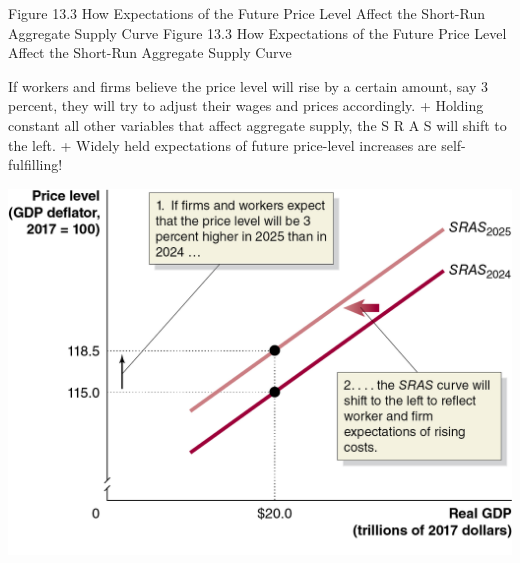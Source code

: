 \documentclass[
  12pt,
  ignorenonframetext,
]{beamer}
\begin{document}
\begin{frame}{Figure 13.3 How Expectations of the Future Price Level
Affect the Short-Run Aggregate Supply Curve}
\protect\hypertarget{figure-13.3-how-expectations-of-the-future-price-level-affect-the-short-run-aggregate-supply-curve}{}
Figure 13.3 How Expectations of the Future Price Level Affect the
Short-Run Aggregate Supply Curve

If workers and firms believe the price level will rise by a certain
amount, say 3 percent, they will try to adjust their wages and prices
accordingly. + Holding constant all other variables that affect
aggregate supply, the S R A S will shift to the left. + Widely held
expectations of future price-level increases are self-fulfilling!

\includegraphics[width=\textwidth,height=0.99\textheight]{imgs3/img_slide26a.png}
\end{frame}
\end{document}
